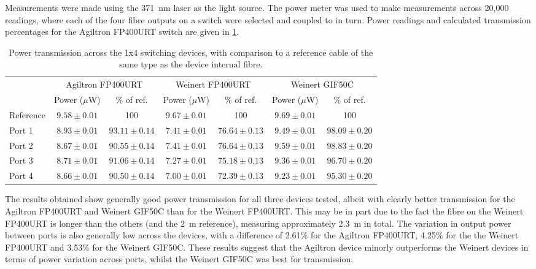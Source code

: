 \documentclass[a4paper,11pt]{article}
\begin{document}
Measurements were made using the 371~nm laser as the light source. The power meter was used to make measurements across 20,000 readings, where each of the four fibre outputs on a switch were selected and coupled to in turn. Power readings and calculated transmission percentages for the Agiltron FP400URT switch are given in \cref{tab:switchpower}.
\begin{table}[h]
\centering
\begin{tabular}{l|cc|cc|cc}
\hline
\multirow{2}{*}{} & \multicolumn{2}{c|}{Agiltron FP400URT} & \multicolumn{2}{c|}{Weinert FP400URT} & \multicolumn{2}{c}{Weinert GIF50C} \\
			&	Power ($\mu$W) & \% of ref. & Power ($\mu$W) & \% of ref. & Power ($\mu$W) & \% of ref.\\ \hline
Reference	& $9.58\pm0.01$	& 100  			 & $9.67\pm0.01$ & 100 			  & $9.69\pm0.01$ & 100 \\
Port 1		& $8.93\pm0.01$	& $93.11\pm0.14$ & $7.41\pm0.01$ & $76.64\pm0.13$ & $9.49\pm0.01$ & $98.09\pm0.20$ \\
Port 2		& $8.67\pm0.01$	& $90.55\pm0.14$ & $7.41\pm0.01$ & $76.64\pm0.13$ & $9.59\pm0.01$ & $98.83\pm0.20$ \\
Port 3		& $8.71\pm0.01$	& $91.06\pm0.14$ & $7.27\pm0.01$ & $75.18\pm0.13$ & $9.36\pm0.01$ & $96.70\pm0.20$ \\
Port 4		& $8.66\pm0.01$	& $90.50\pm0.14$ & $7.00\pm0.01$ & $72.39\pm0.13$ & $9.23\pm0.01$ & $95.30\pm0.20$ \\
\hline
\end{tabular}
\caption{Power transmission across the 1x4 switching devices, with comparison to a reference cable of the same type as the device internal fibre.}\label{tab:switchpower}
\end{table}
The results obtained show generally good power transmission for all three devices tested, albeit with clearly better transmission for the Agiltron FP400URT and Weinert GIF50C than for the Weinert FP400URT. This may be in part due to the fact the fibre on the Weinert FP400URT is longer than the others (and the 2~m reference), measuring approximately 2.3~m in total. The variation in output power between ports is also generally low across the devices, with a difference of 2.61\% for the Agiltron FP400URT, 4.25\% for the the Weinert FP400URT and 3.53\% for the Weinert GIF50C. These results suggest that the Agiltron device minorly outperforms the Weinert devices in terms of power variation across ports, whilst the Weinert GIF50C was best for transmission.
\end{document}
